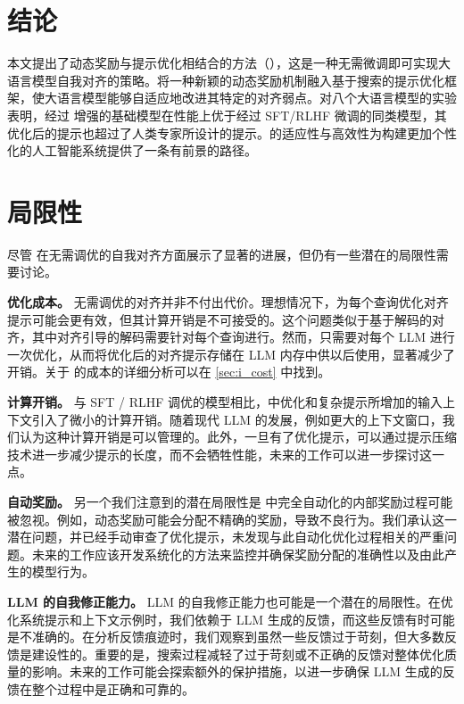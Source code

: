 \vspace{-5pt}
\section{结论}
\vspace{-5pt}

本文提出了动态奖励与提示优化相结合的方法（\ours），这是一种无需微调即可实现大语言模型自我对齐的策略。\ours 将一种新颖的动态奖励机制融入基于搜索的提示优化框架，使大语言模型能够自适应地改进其特定的对齐弱点。对八个大语言模型的实验表明，经过 \ours 增强的基础模型在性能上优于经过 SFT/RLHF 微调的同类模型，其优化后的提示也超过了人类专家所设计的提示。\ours 的适应性与高效性为构建更加个性化的人工智能系统提供了一条有前景的路径。

\newpage
\section*{局限性}

尽管 \ours 在无需调优的自我对齐方面展示了显著的进展，但仍有一些潜在的局限性需要讨论。

\noindent \textbf{优化成本。}  
无需调优的对齐并非不付出代价。理想情况下，为每个查询优化对齐提示可能会更有效，但其计算开销是不可接受的。这个问题类似于基于解码的对齐，其中对齐引导的解码需要针对每个查询进行。然而，\ours 只需要对每个 LLM 进行一次优化，从而将优化后的对齐提示存储在 LLM 内存中供以后使用，显著减少了开销。关于 \ours 的成本的详细分析可以在 \ref{sec:i_cost} 中找到。

\noindent \textbf{计算开销。}  
与 SFT / RLHF 调优的模型相比，\ours 中优化和复杂提示所增加的输入上下文引入了微小的计算开销。随着现代 LLM 的发展，例如更大的上下文窗口，我们认为这种计算开销是可以管理的。此外，一旦有了优化提示，\ours 可以通过提示压缩技术进一步减少提示的长度，而不会牺牲性能，未来的工作可以进一步探讨这一点。

\noindent \textbf{自动奖励。}  
另一个我们注意到的潜在局限性是 \ours 中完全自动化的内部奖励过程可能被忽视。例如，动态奖励可能会分配不精确的奖励，导致不良行为。我们承认这一潜在问题，并已经手动审查了优化提示，未发现与此自动化优化过程相关的严重问题。未来的工作应该开发系统化的方法来监控并确保奖励分配的准确性以及由此产生的模型行为。

\noindent \textbf{LLM 的自我修正能力。}  
LLM 的自我修正能力也可能是一个潜在的局限性。在优化系统提示和上下文示例时，我们依赖于 LLM 生成的反馈，而这些反馈有时可能是不准确的。在分析反馈痕迹时，我们观察到虽然一些反馈过于苛刻，但大多数反馈是建设性的。重要的是，搜索过程减轻了过于苛刻或不正确的反馈对整体优化质量的影响。未来的工作可能会探索额外的保护措施，以进一步确保 LLM 生成的反馈在整个过程中是正确和可靠的。

